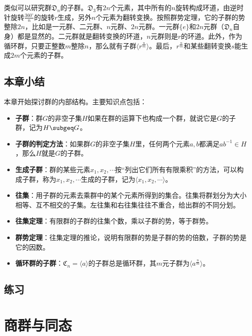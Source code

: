 \documentclass[12pt,UTF8,fontset=none]{ctexbook}
\begin{document}
类似可以研究群$\mathfrak{D}_n$的子群。$\mathfrak{D}_3$有$2n$个元素，其中所有的$n$旋转构成环道，由逆时针旋转$\frac{360^\circ}{n}$的旋转$r$生成，另外$n$个元素为翻转变换。按照群势定理，它的子群的势整除$2n$，比如是一元群、二元群、$n$元群、$2n$元群。一元群$\{e\}$和$2n$元群（$\mathfrak{D}_n$自身）都是显然的。二元群就是翻转变换的环道，$n$元群则是$r$的环道。此外，作为循环群，只要正整数$m$整除$n$，那么就有子群$\langle r^{\frac{n}{m}} \rangle$。最后，$r^{\frac{n}{m}}$和某些翻转变换$s$能生成$2m$个元素的子群。%


\clearpage
\section*{本章小结}

本章开始探讨群的内部结构。主要知识点包括：
\begin{itemize}
    \item \textbf{子群}：群$G$的非空子集$H$如果在群的运算下也构成一个群，就说它是$G$的子群，记为$H\subgeq G$。
    \item \textbf{子群的判定方法}：如果群$G$的非空子集$H$里，任何两个元素$a,b$都满足$ab^{-1}\in H$，那么$H$就是$G$的子群。
    \item \textbf{生成子群}：群的某些元素$x_1,x_2,\cdots$按“列出它们所有有限乘积”的方法，可以构成子群，称为$x_1,x_2,\cdots$生成的子群，记为$\langle x_1,x_2,\cdots\rangle$。
    \item \textbf{往集}：用子群的元素去乘群中的某个元素所得到的集合。往集将群划分为大小相等、互不相交的子集。左往集和右往集往往不重合，给出群的不同分划。
    \item \textbf{往集定理}：有限群的子群的往集个数，乘以子群的势，等于群势。
    \item \textbf{群势定理}：往集定理的推论，说明有限群的势是子群的势的倍数，子群的势是它的因数。
    \item \textbf{循环群的子群}：$\mathfrak{C}_n = \langle a\rangle$的子群总是循环群，其$m$元子群为$\langle a^\frac{n}{m}\rangle$。
\end{itemize}

\clearpage
\section{练习}

\chapter{商群与同态}
\end{document}
